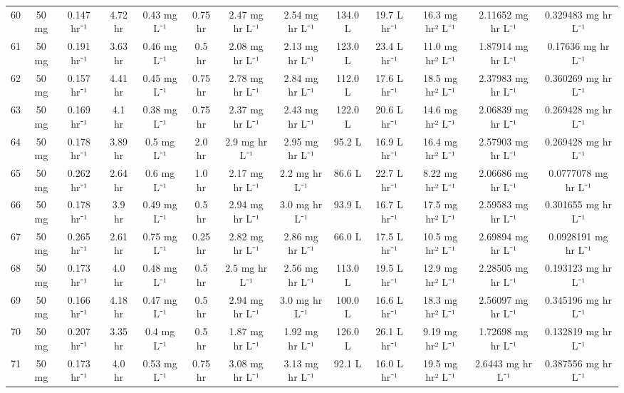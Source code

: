 \documentclass[12pt,a4paper]{article}
\begin{document}
\begin{tabular}{r|cccccccccccc}
	60 & 50 mg & 0.147 hr⁻¹ & 4.72 hr & 0.43 mg L⁻¹ & 0.75 hr & 2.47 mg hr L⁻¹ & 2.54 mg hr L⁻¹ & 134.0 L & 19.7 L hr⁻¹ & 16.3 mg hr² L⁻¹ & 2.11652 mg hr L⁻¹ & 0.329483 mg hr L⁻¹ \\
	61 & 50 mg & 0.191 hr⁻¹ & 3.63 hr & 0.46 mg L⁻¹ & 0.5 hr & 2.08 mg hr L⁻¹ & 2.13 mg hr L⁻¹ & 123.0 L & 23.4 L hr⁻¹ & 11.0 mg hr² L⁻¹ & 1.87914 mg hr L⁻¹ & 0.17636 mg hr L⁻¹ \\
	62 & 50 mg & 0.157 hr⁻¹ & 4.41 hr & 0.45 mg L⁻¹ & 0.75 hr & 2.78 mg hr L⁻¹ & 2.84 mg hr L⁻¹ & 112.0 L & 17.6 L hr⁻¹ & 18.5 mg hr² L⁻¹ & 2.37983 mg hr L⁻¹ & 0.360269 mg hr L⁻¹ \\
	63 & 50 mg & 0.169 hr⁻¹ & 4.1 hr & 0.38 mg L⁻¹ & 0.75 hr & 2.37 mg hr L⁻¹ & 2.43 mg hr L⁻¹ & 122.0 L & 20.6 L hr⁻¹ & 14.6 mg hr² L⁻¹ & 2.06839 mg hr L⁻¹ & 0.269428 mg hr L⁻¹ \\
	64 & 50 mg & 0.178 hr⁻¹ & 3.89 hr & 0.5 mg L⁻¹ & 2.0 hr & 2.9 mg hr L⁻¹ & 2.95 mg hr L⁻¹ & 95.2 L & 16.9 L hr⁻¹ & 16.4 mg hr² L⁻¹ & 2.57903 mg hr L⁻¹ & 0.269428 mg hr L⁻¹ \\
	65 & 50 mg & 0.262 hr⁻¹ & 2.64 hr & 0.6 mg L⁻¹ & 1.0 hr & 2.17 mg hr L⁻¹ & 2.2 mg hr L⁻¹ & 86.6 L & 22.7 L hr⁻¹ & 8.22 mg hr² L⁻¹ & 2.06686 mg hr L⁻¹ & 0.0777078 mg hr L⁻¹ \\
	66 & 50 mg & 0.178 hr⁻¹ & 3.9 hr & 0.49 mg L⁻¹ & 0.5 hr & 2.94 mg hr L⁻¹ & 3.0 mg hr L⁻¹ & 93.9 L & 16.7 L hr⁻¹ & 17.5 mg hr² L⁻¹ & 2.59583 mg hr L⁻¹ & 0.301655 mg hr L⁻¹ \\
	67 & 50 mg & 0.265 hr⁻¹ & 2.61 hr & 0.75 mg L⁻¹ & 0.25 hr & 2.82 mg hr L⁻¹ & 2.86 mg hr L⁻¹ & 66.0 L & 17.5 L hr⁻¹ & 10.5 mg hr² L⁻¹ & 2.69894 mg hr L⁻¹ & 0.0928191 mg hr L⁻¹ \\
	68 & 50 mg & 0.173 hr⁻¹ & 4.0 hr & 0.48 mg L⁻¹ & 0.5 hr & 2.5 mg hr L⁻¹ & 2.56 mg hr L⁻¹ & 113.0 L & 19.5 L hr⁻¹ & 12.9 mg hr² L⁻¹ & 2.28505 mg hr L⁻¹ & 0.193123 mg hr L⁻¹ \\
	69 & 50 mg & 0.166 hr⁻¹ & 4.18 hr & 0.47 mg L⁻¹ & 0.5 hr & 2.94 mg hr L⁻¹ & 3.0 mg hr L⁻¹ & 100.0 L & 16.6 L hr⁻¹ & 18.3 mg hr² L⁻¹ & 2.56097 mg hr L⁻¹ & 0.345196 mg hr L⁻¹ \\
	70 & 50 mg & 0.207 hr⁻¹ & 3.35 hr & 0.4 mg L⁻¹ & 0.5 hr & 1.87 mg hr L⁻¹ & 1.92 mg hr L⁻¹ & 126.0 L & 26.1 L hr⁻¹ & 9.19 mg hr² L⁻¹ & 1.72698 mg hr L⁻¹ & 0.132819 mg hr L⁻¹ \\
	71 & 50 mg & 0.173 hr⁻¹ & 4.0 hr & 0.53 mg L⁻¹ & 0.75 hr & 3.08 mg hr L⁻¹ & 3.13 mg hr L⁻¹ & 92.1 L & 16.0 L hr⁻¹ & 19.5 mg hr² L⁻¹ & 2.6443 mg hr L⁻¹ & 0.387556 mg hr L⁻¹ \\

\end{tabular}
\end{document}
